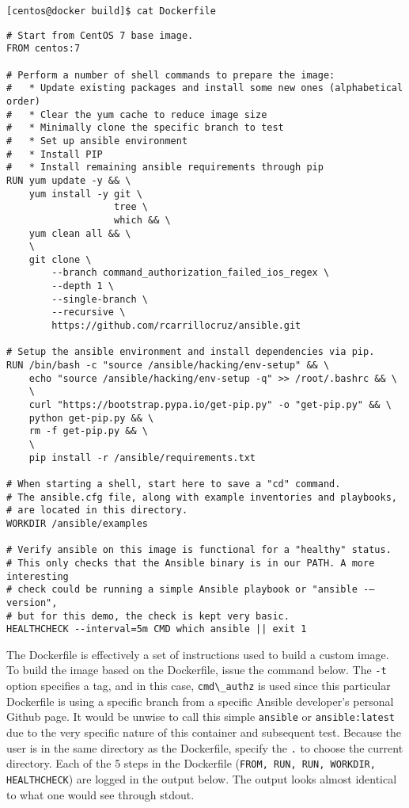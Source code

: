 \begin{verbatim}
[centos@docker build]$ cat Dockerfile
\end{verbatim}

\begin{verbatim}
# Start from CentOS 7 base image.
FROM centos:7

# Perform a number of shell commands to prepare the image:
#   * Update existing packages and install some new ones (alphabetical order)
#   * Clear the yum cache to reduce image size
#   * Minimally clone the specific branch to test
#   * Set up ansible environment
#   * Install PIP
#   * Install remaining ansible requirements through pip
RUN yum update -y && \
    yum install -y git \
                   tree \
                   which && \
    yum clean all && \
    \
    git clone \
        --branch command_authorization_failed_ios_regex \
        --depth 1 \
        --single-branch \
        --recursive \
        https://github.com/rcarrillocruz/ansible.git

# Setup the ansible environment and install dependencies via pip.
RUN /bin/bash -c "source /ansible/hacking/env-setup" && \
    echo "source /ansible/hacking/env-setup -q" >> /root/.bashrc && \
    \
    curl "https://bootstrap.pypa.io/get-pip.py" -o "get-pip.py" && \
    python get-pip.py && \
    rm -f get-pip.py && \
    \
    pip install -r /ansible/requirements.txt

# When starting a shell, start here to save a "cd" command.
# The ansible.cfg file, along with example inventories and playbooks,
# are located in this directory.
WORKDIR /ansible/examples

# Verify ansible on this image is functional for a "healthy" status.
# This only checks that the Ansible binary is in our PATH. A more interesting
# check could be running a simple Ansible playbook or "ansible -–version",
# but for this demo, the check is kept very basic.
HEALTHCHECK --interval=5m CMD which ansible || exit 1
\end{verbatim}

The Dockerfile is effectively a set of instructions used to build a custom
image. To build the image based on the Dockerfile, issue the command below.
The \verb|-t| option specifies a tag, and in this case, \verb|cmd\_authz| is used since
this particular Dockerfile is using a specific branch from a specific Ansible
developer's personal Github page. It would be unwise to call this simple
\verb|ansible| or \verb|ansible:latest| due to the very specific nature of this
container and subsequent test. Because the user is in the same directory as
the Dockerfile, specify the \verb|.| to choose the current directory. Each of the 5
steps in the Dockerfile (\verb|FROM, RUN, RUN, WORKDIR, HEALTHCHECK|) are logged
in the output below. The output looks almost identical to what one would see
through stdout.

